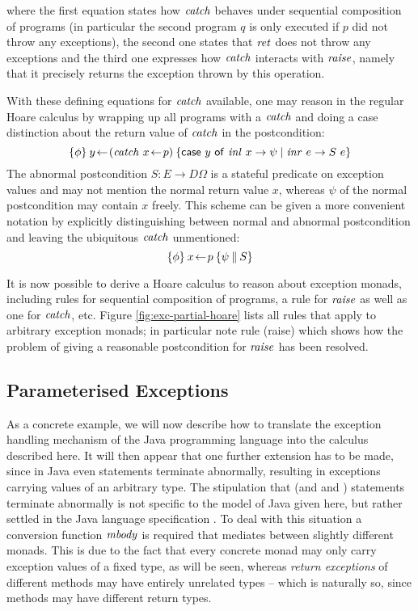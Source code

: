 where the first equation states how $\mathit{catch}$ behaves under sequential
composition of programs (in particular the second program $q$ is only executed
if $p$ did not throw any exceptions), the second one states that $\mathit{ret}$ does not
throw any exceptions and the third one expresses how $\mathit{catch}$ interacts with
$\mathit{raise}$, namely that it precisely returns the exception thrown by this
operation. 

With these defining equations for $\mathit{catch}$ available, one may reason in the
regular Hoare calculus by wrapping up all programs with a $\mathit{catch}$ and doing a
case distinction about the return value of $\mathit{catch}$ in the postcondition:
\[
\{\phi\}\:y \!\gets\! (\mathit{catch}\ x \!\gets\! p)\:\{\mathsf{case}\ y\ \mathsf{of}\ \mathit{inl}~x \to \psi \;|\; \mathit{inr}~e \to S~e\}
\]
The abnormal postcondition $S : E \to D\Omega$ is a stateful predicate on exception
values and may not mention the normal return value $x$, whereas $\psi$ of the
normal postcondition may contain $x$ freely. This scheme can be given a more
convenient notation by explicitly distinguishing between normal and abnormal
postcondition and leaving the ubiquitous $\mathit{catch}$ unmentioned:
\[
\{\phi\}\:x \!\gets\! p\:\{\psi\:\|\:S\}
\]

It is now possible to derive a Hoare calculus to reason about exception monads,
including rules for sequential composition of programs, a rule for $\mathit{raise}$ as
well as one for $\mathit{catch}$, etc.  Figure \ref{fig:exc-partial-hoare} lists all
rules that apply to arbitrary exception monads; in particular note rule (raise)
which shows how the problem of giving a reasonable postcondition for $\mathit{raise}$
has been resolved. 

\subsection{Parameterised Exceptions}
\label{sec:param-except}

As a concrete example, we will now describe how to translate the exception
handling mechanism of the Java programming language into the calculus described
here. It will then appear that one further extension has to be made, since in
Java even  statements terminate abnormally, resulting in exceptions
carrying values of an arbitrary type. The stipulation that  (and
 and ) statements terminate abnormally is not
specific to the model of Java given here, but rather settled in the Java
language specification \cite{JoySteeleGoslingBracha00}.  To deal with this
situation a conversion function $\mathit{mbody}$ is required that mediates between
slightly different monads. This is due to the fact that every concrete monad may only
carry exception values of a fixed type, as will be seen, whereas \emph{return
  exceptions} of different methods may have entirely unrelated types -- which is
naturally so, since methods may have different return types.

